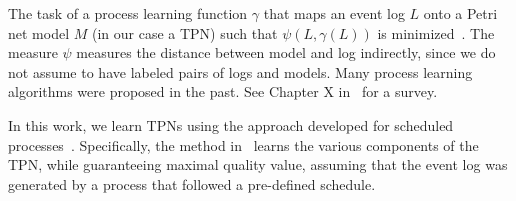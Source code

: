 The task of a process learning function $\gamma$ that maps 
an event log $L$ onto a Petri net model $M$ (in our case a TPN)
such that $\psi(L,\gamma(L))$ is minimized~\cite{AalstBook}. 
The measure $\psi$ measures the distance
between model and log indirectly,
since we do not assume to have labeled pairs of logs and models.
Many process learning algorithms were proposed in the past. See Chapter X
in~\cite{AalstBook} for a survey.

In this work, we learn TPNs using the
approach developed 
for scheduled processes~\cite{DBLP:conf/bpm/SenderovichRGMM15}.
Specifically, the method in~\cite{DBLP:conf/bpm/SenderovichRGMM15} learns
the various components of the TPN, 
while guaranteeing maximal quality value, assuming
that the event log was generated by 
a process that followed a pre-defined schedule.
 


